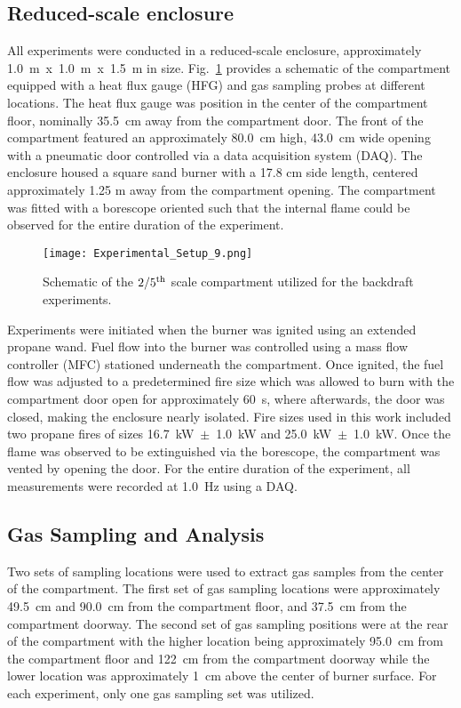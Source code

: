 \documentclass[12pt,letterpaper]{article}
\begin{document}
\begin{flushleft}
\subsection{Reduced-scale enclosure} \addvspace{10pt}
All experiments were conducted in a reduced-scale enclosure, approximately 1.0~m~x~1.0~m~x~1.5~m in size. Fig.~\ref{fig:Backdraft_experimental_setup} provides a schematic of the compartment equipped with a heat flux gauge (HFG) and gas sampling probes at different locations. The heat flux gauge was position in the center of the compartment floor, nominally 35.5~cm away from the compartment door. The front of the compartment featured an approximately 80.0~cm high, 43.0~cm wide opening with a pneumatic door controlled via a data acquisition system (DAQ). The enclosure housed a square sand burner with a 17.8 cm side length, centered approximately 1.25 m away from the compartment opening. The compartment was fitted with a borescope oriented such that the internal flame could be observed for the entire duration of the experiment.
\begin{figure}[!]
	\centering
\texttt{[image: Experimental\_Setup\_9.png]}
	\caption{Schematic of the $2/5^{\rm{th}}$ scale compartment utilized for the backdraft experiments.}
	\label{fig:Backdraft_experimental_setup}
\end{figure}
Experiments were initiated when the burner was ignited using an extended propane wand. Fuel flow into the burner was controlled using a mass flow controller (MFC) stationed underneath the compartment. Once ignited, the fuel flow was adjusted to a predetermined fire size which was allowed to burn with the compartment door open for approximately 60~s, where afterwards, the door was closed, making the enclosure nearly isolated.  Fire sizes used in this work included two propane fires of sizes 16.7~kW~$\pm$~1.0~kW and 25.0~kW~$\pm$~1.0~kW. Once the flame was observed to be extinguished via the borescope, the compartment was vented by opening the door. For the entire duration of the experiment, all measurements were recorded at 1.0~Hz using a DAQ.

\subsection{Gas Sampling and Analysis} \addvspace{10pt}
\label{ssec:Gas_Samp_Anal}
Two sets of sampling locations were used to extract gas samples from the center of the compartment. The first set of gas sampling locations were approximately 49.5~cm and 90.0~cm from the compartment floor, and 37.5~cm from the compartment doorway. The second set of gas sampling positions were at the rear of the compartment with the higher location being approximately 95.0~cm from the compartment floor and 122~cm from the compartment doorway while the lower location was approximately 1~cm above the center of burner surface. For each experiment, only one gas sampling set was utilized.


\end{flushleft}
\end{document}
